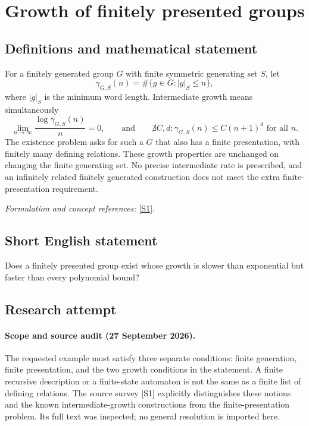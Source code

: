 \documentclass[11pt]{article}
\begin{document}
\section*{\texorpdfstring{Growth of finitely presented groups}{Growth of finitely presented groups}}\label{3329}
\subsection{Definitions and mathematical statement}
For a finitely generated group $G$ with finite symmetric generating set $S$, let
\[
 \gamma_{G,S}(n)=\#\{g\in G:|g|_S\le n\},
\]
where $|g|_S$ is the minimum word length. Intermediate growth means simultaneously
\[
 \lim_{n\to\infty}\frac{\log\gamma_{G,S}(n)}n=0,
 \qquad\text{and}\qquad
 \nexists C,d:\gamma_{G,S}(n)\le C(n+1)^d\text{ for all }n.
\]
The existence problem asks for such a $G$ that also has a finite presentation, with finitely many defining relations. These growth properties are unchanged on changing the finite generating set. No precise intermediate rate is prescribed, and an infinitely related finitely generated construction does not meet the extra finite-presentation requirement.
\par\smallskip\textit{Formulation and concept references:} \href{https://ar5iv.labs.arxiv.org/html/1111.0512}{[S1]}.

\subsection{Short English statement}
Does a finitely presented group exist whose growth is slower than exponential but faster than every polynomial bound?
\subsection{Research attempt}
\paragraph{Scope and source audit (27 September 2026).}
The requested example must satisfy three separate conditions: finite
generation, finite presentation, and the two growth conditions in the
statement. A finite recursive description or a finite-state automaton
is not the same as a finite list of defining relations. The source
survey [S1] explicitly distinguishes these notions and the known
intermediate-growth constructions from the finite-presentation problem.
Its full text was inspected; no general resolution is imported here.
\end{document}
